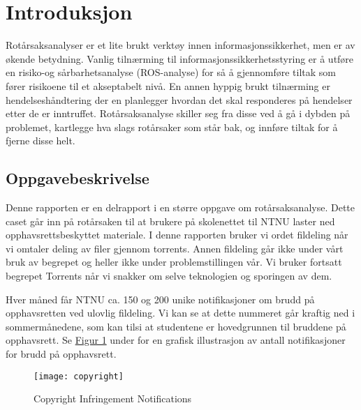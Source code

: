\chapter{Introduksjon}
Rotårsaksanalyser er et lite brukt verktøy innen informasjonssikkerhet, men er av økende betydning. Vanlig tilnærming til informasjonssikkerhetsstyring er å utføre en risiko-og sårbarhetsanalyse (ROS-analyse) for så å gjennomføre tiltak som fører risikoene til et akseptabelt nivå. En annen hyppig brukt tilnærming er hendelseshåndtering der en planlegger hvordan det skal responderes på hendelser etter de er inntruffet. Rotårsaksanalyse skiller seg fra disse ved å gå i dybden på problemet, kartlegge hva slags rotårsaker som står bak, og innføre tiltak for å fjerne disse helt.

\section{Oppgavebeskrivelse}
Denne rapporten er en delrapport i en større oppgave om rotårsaksanalyse. Dette caset går inn på rotårsaken til at brukere på skolenettet til NTNU laster ned opphavsrettsbeskyttet materiale. I denne rapporten bruker vi ordet fildeling når vi omtaler deling av filer gjennom torrents. Annen fildeling går ikke under vårt bruk av begrepet og heller ikke under problemstillingen vår. Vi bruker fortsatt begrepet Torrents når vi snakker om selve teknologien og sporingen av dem.

Hver måned får NTNU ca. 150 og 200 unike notifikasjoner om brudd på opphavsretten ved ulovlig fildeling. Vi kan se at dette nummeret går kraftig ned i sommermånedene, som kan tilsi at studentene er hovedgrunnen til bruddene på opphavsrett. Se \hyperref[fig:copyright]{Figur 1} under for en grafisk illustrasjon av antall notifikasjoner for brudd på opphavsrett.

\begin{figure}[H]
    \centering
    \texttt{[image: copyright]}
    \label{fig:copyright}
    \caption[Copyright Infringement Notifications]{Copyright Infringement Notifications}
\end{figure}

\begin{comment}
\begin{table} [H]
    \begin{tabular}{ | m{12em} | m{12em} | m{12em} | }
        \hline
            \cellcolor{yellow} & \cellcolor{yellow} Breaches & \cellcolor{yellow} Copyright breach/Piracy\\
        \hline
            Policy Violation & Information Security Policy & 2 \\
        \hline
             & IT Policy & 43 \\
        \hline
    \end{tabular}
    \caption{Oversikt over kvantiteten av brudd på policy}
    \label{kritisk_tabell_1}
\end{table}
\end{comment}

